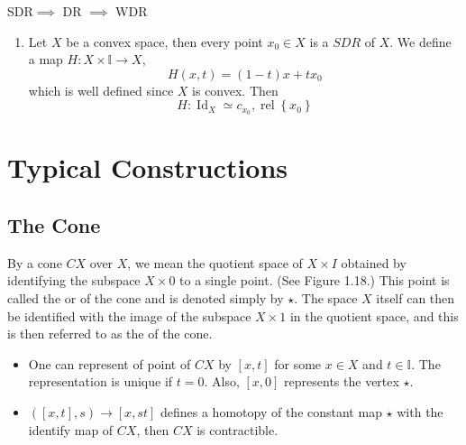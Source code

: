 \documentclass[../main.tex]{subfiles}
\begin{document}
\begin{remark}
    SDR\(  \implies   \) DR \(  \implies   \) WDR  
\end{remark}

\begin{example}{}{}
    \begin{enumerate}
        \item Let \(  X  \) be a convex space, then every point \(  x_0 \in X  \) is a \(  SDR  \) of \(  X  \).    We define a map \(  H: X\times \mathbb{I}\to X  \),  \[
        H\left( x,t \right)= \left( 1-t \right)x+ tx_0  
        \]which is well defined since \(  X  \) is convex. Then \[
         H: \operatorname{Id}_{X}\simeq  c_{x_0}   , \operatorname{rel} \left\{ x_0 \right\}
        \]
    \end{enumerate}
    
\end{example}

\section{Typical Constructions}
\subsection{The Cone}

\begin{definition}{}{} 
By a cone $CX$ over $X$, we mean the quotient space of $X \times I$ obtained by identifying the subspace $X \times 0$ to a single point. (See Figure 1.18.) This point is called the  or  of the cone and is denoted simply by $\star$. The space $X$ itself can then be identified with the image of the subspace $X \times 1$ in the quotient space, and this is then referred to as the  of the cone.
\end{definition}

\begin{remark}
    
\begin{itemize}
    \item One can represent of point of \(  CX  \) by \(  \left[ x,t \right]   \) for some \(  x \in X  \) and \(  t\in \mathbb{I}  \). The representation is unique  if \(  t= 0  \). Also, \(  \left[ x,0 \right]   \) represents the vertex \(  \star  \).       
    \item \(  \left( [x,t],s \right)\to \left[ x,st \right]    \) defines a homotopy of the constant map \(  \star  \) with the identify map of \(  CX  \), then \(  CX  \) is contractible.    
\end{itemize}

\end{remark}
\end{document}
